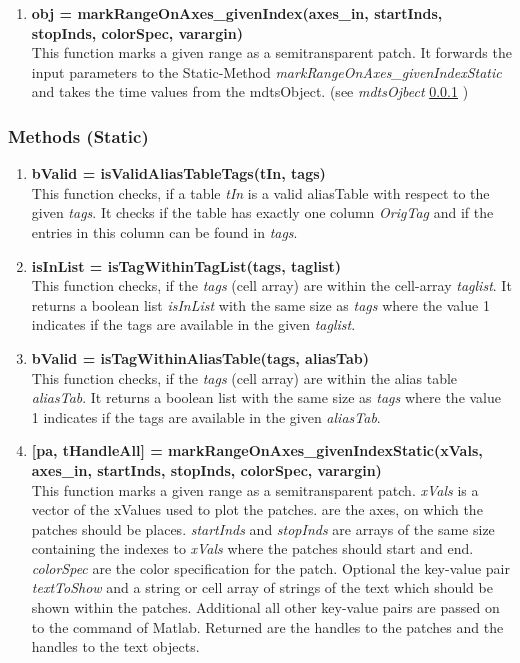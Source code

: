 \documentclass[a4]{scrreprt}
\begin{document}
\begin{enumerate}
\item \textbf{obj = markRangeOnAxes\_givenIndex(axes\_in, startInds, stopInds, colorSpec, varargin)}\\
This function marks a given range as a semitransparent patch. It forwards the input parameters to the Static-Method \textit{markRangeOnAxes\_givenIndexStatic} and takes the time values from the mdtsObject.
(see \textit{mdtsOjbect} \ref{sssec:mdtsObj:MethodsStatic} )



\end{enumerate}

\subsubsection{Methods (Static)}
\label{sssec:mdtsObj:MethodsStatic}
\begin{enumerate}
	
	\item \textbf{bValid = isValidAliasTableTags(tIn, tags)}\\
	This function checks, if a table \textit{tIn} is a valid aliasTable with respect to the given \textit{tags}. It checks if the table has exactly one column \textit{OrigTag} and if the entries in this column can be found in \textit{tags}.
	
	\item \textbf{isInList = isTagWithinTagList(tags, taglist)}\\
	This function checks, if the \textit{tags} (cell array) are within the cell-array  \textit{taglist}. It returns a boolean list \textit{isInList} with the same size as \textit{tags} where the value 1 indicates if the tags are available in the given \textit{taglist}.
	
	\item \textbf{bValid = isTagWithinAliasTable(tags, aliasTab)}\\
	This function checks, if the \textit{tags} (cell array) are within the alias table  \textit{aliasTab}. It returns a boolean list with the same size as \textit{tags} where the value 1 indicates if the tags are available in the given \textit{aliasTab}.
	
	\item \textbf{[pa, tHandleAll] = markRangeOnAxes\_givenIndexStatic(xVals, axes\_in, startInds, stopInds, colorSpec, varargin)}\\
	This function marks a given range as a semitransparent patch. \textit{xVals} is a vector of the xValues used to plot the patches.  are the axes, on which the patches should be places. \textit{startInds} and \textit{stopInds} are arrays of the same size containing the indexes to \textit{xVals} where the patches should start and end. \textit{colorSpec} are the color specification for the patch. Optional the key-value pair \textit{textToShow} and a string or cell array of strings of the text which should be shown within the patches. Additional all other key-value pairs are passed on to the  command of Matlab. Returned are the handles to the patches and the handles to the text objects.
	
	
\end{enumerate}
\end{document}
